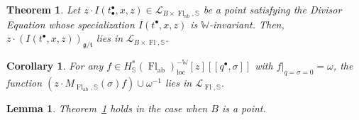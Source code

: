 \documentclass[10pt,a4paper]{amsart}
\newtheorem{theorem}{Theorem}
\newtheorem{corollary}{Corollary}
\newtheorem{lemma}{Lemma}
\newcommand{\Fl}{\operatorname{Fl}}
\newcommand{\FlG}{\operatorname{Fl}}
\newcommand{\FlT}{\operatorname{Fl}_{\operatorname{ab}}}
\newcommand{\W}{\mathbb{W}}
\newcommand{\bbS}{\mathbb{S}}
\newcommand{\cL}{\mathcal{L}}
\newcommand{\gt}{{\mathfrak{g}/\mathfrak{t}}}
\newcommand{\loc}{{\operatorname{loc}}}
\begin{document}
\begin{theorem}\label{thm:abelian/nonabelian_correspondence}
    Let $z\cdot I(t^\bullet_\bullet,x,z) \in \cL_{B\times\FlT,\bbS}$ be a point satisfying the Divisor Equation whose specialization $I(t^\bullet,x,z)$ is $\W$-invariant.
    Then, $z \cdot (I(t^\bullet,x,z))_\gt$ lies in $\cL_{B\times\Fl,\bbS}$.
\end{theorem}

\begin{corollary}\label{cor:CFKS}
    For any $f\in H^*_\bbS(\FlT)^{-\W}_\loc[z][\![q^\bullet,\sigma]\!]$ with $f|_{q=\sigma=0}=\omega$, the function $(z\cdot M_{\FlT,\bbS}(\sigma)f) \cup \omega^{-1}$ lies in $\cL_{\FlG,\bbS}$.
\end{corollary}

\begin{lemma} \label{lemma:ab/nonab for flag}
Theorem~\ref{thm:abelian/nonabelian_correspondence} holds in the case when $B$ is a point. 
\end{lemma}
\end{document}
